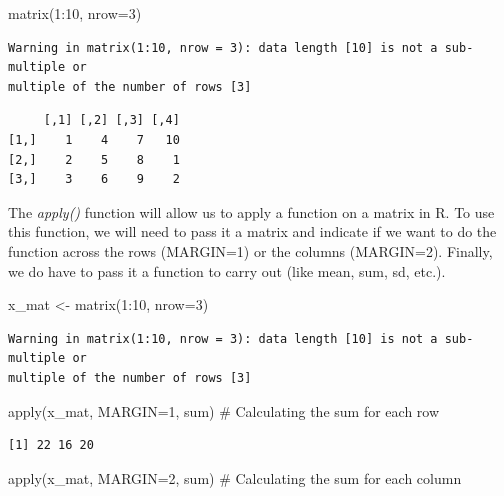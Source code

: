 \documentclass[
  letterpaper,
  DIV=11,
  numbers=noendperiod]{scrreprt}
\newenvironment{Shaded}{\begin{snugshade}}{\end{snugshade}}
\newcommand{\AttributeTok}[1]{\textcolor[rgb]{0.40,0.45,0.13}{#1}}
\newcommand{\CommentTok}[1]{\textcolor[rgb]{0.37,0.37,0.37}{#1}}
\newcommand{\DecValTok}[1]{\textcolor[rgb]{0.68,0.00,0.00}{#1}}
\newcommand{\FunctionTok}[1]{\textcolor[rgb]{0.28,0.35,0.67}{#1}}
\newcommand{\NormalTok}[1]{\textcolor[rgb]{0.00,0.23,0.31}{#1}}
\newcommand{\OtherTok}[1]{\textcolor[rgb]{0.00,0.23,0.31}{#1}}
\newcommand{\SpecialCharTok}[1]{\textcolor[rgb]{0.37,0.37,0.37}{#1}}
\begin{document}
\begin{Shaded}
\begin{Highlighting}[]
\FunctionTok{matrix}\NormalTok{(}\DecValTok{1}\SpecialCharTok{:}\DecValTok{10}\NormalTok{, }\AttributeTok{nrow=}\DecValTok{3}\NormalTok{)}
\end{Highlighting}
\end{Shaded}

\begin{verbatim}
Warning in matrix(1:10, nrow = 3): data length [10] is not a sub-multiple or
multiple of the number of rows [3]
\end{verbatim}

\begin{verbatim}
     [,1] [,2] [,3] [,4]
[1,]    1    4    7   10
[2,]    2    5    8    1
[3,]    3    6    9    2
\end{verbatim}

The \emph{apply()} function will allow us to apply a function on a
matrix in R. To use this function, we will need to pass it a matrix and
indicate if we want to do the function across the rows (MARGIN=1) or the
columns (MARGIN=2). Finally, we do have to pass it a function to carry
out (like mean, sum, sd, etc.).

\begin{Shaded}
\begin{Highlighting}[]
\NormalTok{x\_mat }\OtherTok{\textless{}{-}} \FunctionTok{matrix}\NormalTok{(}\DecValTok{1}\SpecialCharTok{:}\DecValTok{10}\NormalTok{, }\AttributeTok{nrow=}\DecValTok{3}\NormalTok{)}
\end{Highlighting}
\end{Shaded}

\begin{verbatim}
Warning in matrix(1:10, nrow = 3): data length [10] is not a sub-multiple or
multiple of the number of rows [3]
\end{verbatim}

\begin{Shaded}
\begin{Highlighting}[]
\FunctionTok{apply}\NormalTok{(x\_mat, }\AttributeTok{MARGIN=}\DecValTok{1}\NormalTok{, sum) }\CommentTok{\# Calculating the sum for each row}
\end{Highlighting}
\end{Shaded}

\begin{verbatim}
[1] 22 16 20
\end{verbatim}

\begin{Shaded}
\begin{Highlighting}[]
\FunctionTok{apply}\NormalTok{(x\_mat, }\AttributeTok{MARGIN=}\DecValTok{2}\NormalTok{, sum) }\CommentTok{\# Calculating the sum for each column}
\end{Highlighting}
\end{Shaded}
\end{document}
